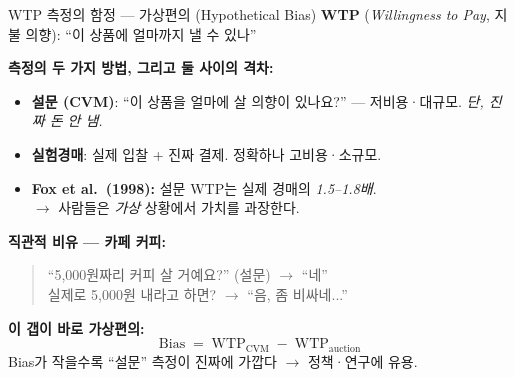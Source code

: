 \documentclass[aspectratio=169]{beamer}
\begin{document}
\begin{frame}{WTP 측정의 함정 --- 가상편의 (Hypothetical Bias)}
  \textbf{WTP} (\emph{Willingness to Pay}, 지불 의향): ``이 상품에 얼마까지 낼 수 있나''

  \vspace{0.4em}
  \textbf{측정의 두 가지 방법, 그리고 둘 사이의 격차:}
  \begin{itemize}\itemsep0.15em
    \item \textbf{설문 (CVM)}: ``이 상품을 얼마에 살 의향이 있나요?'' --- 저비용·대규모. \emph{단, 진짜 돈 안 냄.}
    \item \textbf{실험경매}: 실제 입찰 + 진짜 결제. 정확하나 고비용·소규모.
    \item \textbf{Fox et al.\ (1998):} 설문 WTP는 실제 경매의 \emph{1.5--1.8배}. \\
      $\rightarrow$ 사람들은 \emph{가상} 상황에서 가치를 과장한다.
  \end{itemize}

  \vspace{0.4em}
  \textbf{직관적 비유 --- 카페 커피:}
  \begin{quote}
    ``5,000원짜리 커피 살 거예요?'' (설문) $\rightarrow$ ``네''\\
    실제로 5,000원 내라고 하면? $\rightarrow$ ``음, 좀 비싸네...''
  \end{quote}

  \vspace{0.3em}
  \textbf{이 갭이 바로 가상편의:}
  \[
    \mathrm{Bias} \;=\; \mathrm{WTP}_{\text{CVM}} \;-\; \mathrm{WTP}_{\text{auction}}
  \]
  Bias가 작을수록 ``설문'' 측정이 진짜에 가깝다 $\rightarrow$ 정책·연구에 유용.

  \vspace{0.3em}
\end{frame}
\end{document}

